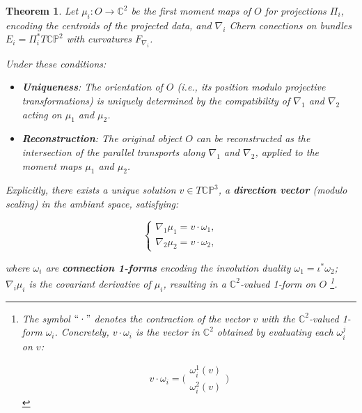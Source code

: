 \documentclass[runningheads]{llncs}
\newtheorem{thm}{Theorem}
\begin{document}
\begin{thm}\label{P:2}
Let \( \mu_i: O \to \mathbb{C}^2 \) be the first moment maps of \( O \) for projections \( \Pi_i \), encoding the centroids of the projected data, and $\nabla_i$ Chern conections on bundles $E_i=\Pi_i^*T\mathbb{CP}^2$ with curvatures $F_{\nabla_i}$.

\smallskip 

Under these conditions:

\begin{itemize}
\item  {\bf Uniqueness}: The orientation of \( O \) (i.e., its position modulo projective transformations) is uniquely determined by the compatibility of \( \nabla_1 \) and \( \nabla_2 \) acting on \( \mu_1 \) and \( \mu_2 \).

\item {\bf Reconstruction}: The original object \( O \) can be reconstructed as the intersection of the parallel transports along \( \nabla_1 \) and \( \nabla_2 \), applied to the moment maps \( \mu_1 \) and \( \mu_2 \).
\end{itemize}
Explicitly, there exists a unique solution \( v \in T\mathbb{CP}^3 \), a {\bf direction vector} (modulo scaling) in the ambiant space, satisfying:

\[
\begin{cases}
\nabla_1 \mu_1 = v \cdot \omega_1, \\
\nabla_2 \mu_2 = v \cdot \omega_2, 
\end{cases}
\]

where \( \omega_i \) are {\bf connection 1-forms} encoding the involution duality \( \omega_1 = \iota^* \omega_2 \);
 $\nabla_i \mu_i$ is the covariant derivative of $\mu_i$, resulting in a $\mathbb{C}^2$-valued 1-form on $O$ \footnote{ The symbol $``\cdot"$ denotes the contraction of the vector $v$ with the $\mathbb{C}^2$-valued  1-form $\omega_i$. Concretely, 
$v \cdot \omega_i$ is the vector in $\mathbb{C}^2$ obtained by evaluating each $\omega_i^j$ on $v$: 

\[ v \cdot \omega_i=\bigg(\begin{smallmatrix} \omega_i^1(v)\\ \omega_i^2(v)\end{smallmatrix}\bigg)\]}. 
\end{thm}
\end{document}
